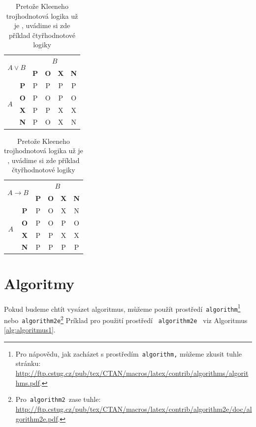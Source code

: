 \documentclass[a4paper, 11pt]{article}
\begin{document}
\begin{table}[ht!]
        \begin{minipage}{.27\linewidth}
        \begin{tabular}{| c | c | c | c | c | c |}
        \hline
            \multicolumn{2}{|c|}{\multirow{2}{*}{$A \vee B$}} & \multicolumn{4}{|c|}{$B$} \\ \cline{3-6}
            \multicolumn{2}{|c|}{} & \textbf{P} & \textbf{O} & \textbf{X} & \textbf{N} \\ \hline
            \multirow{4}{1em}{$A$} &\textbf{P} & P & P & P & P \\ \cline{2-6}
            &\textbf{O} & P & O & P & O \\ \cline{2-6}
            &\textbf{X} & P & P & X & X \\ \cline{2-6}
            &\textbf{N} & P & O & X & N \\ 
            \hline
        \end{tabular}
        \end{minipage}%
        \begin{minipage}{.3\linewidth}
        \begin{tabular}{| c | c | c | c | c | c |} 
        \hline
            \multicolumn{2}{|c}{\multirow{2}{*}{$A \rightarrow B$}} & \multicolumn{4}{|c|}{$B$} \\ \cline{3-6}
             \multicolumn{2}{|c|}{} & \textbf{P} & \textbf{O} & \textbf{X} & \textbf{N} \\ \hline
            \multirow{4}{1em}{$A$} &\textbf{P} & P & O & X & N \\ \cline{2-6}
            &\textbf{O} & P & O & P & O \\ \cline{2-6}
            &\textbf{X} & P & P & X & X \\ \cline{2-6}
            &\textbf{N} & P & P & P & P \\ 
            \hline
        \end{tabular}
        \end{minipage}
        \caption{Pretože Kleeneho trojhodnotová logika už je , uvádime si zde příklad čtyřhodnotové logiky} \label{table:tabulka2}
    \end{table}
    \medskip
    \pagebreak
    
    \section{Algoritmy} \label{sec:alogoritmy}
    Pokud budeme chtít vysázet algoritmus, můžeme použít prostředí\texttt{ algorithm}\footnote{Pro nápovědu, jak zacházet s prostředím\texttt{ algorithm,} můžeme zkusit tuhle stránku:\\ \url{http://ftp.cstug.cz/pub/tex/CTAN/macros/latex/contrib/algorithms/algorithms.pdf}.} 
    nebo\texttt{ algorithm2e}\footnote{Pro\texttt{ algorithm2 }zase tuhle: \url{http://ftp.cstug.cz/pub/tex/CTAN/macros/latex/contrib/algorithm2e/doc/algorithm2e.pdf}.}
    Príklad pro použití prostředí \texttt{ algorithm2e } viz Algoritmus \ref*{alg:algoritmus1}.
    
\end{document}
